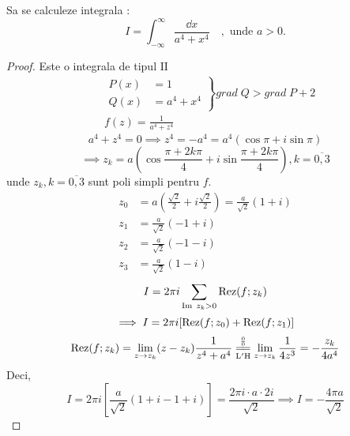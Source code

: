 
\begin{aplicatie}
    Sa se calculeze integrala :
    \[
        I = \int_{-\infty}^{\infty} \frac{\dd x}{a^4+x^4} \quad , \text{ unde } a > 0.
    \]
    \begin{proof}

    Este o integrala de tipul $\mathrm{II}$
    \begin{align*}
        &\left .
            \begin{aligned}
                P(x) &= 1 \\
                Q(x) &= a^4 +x^4
            \end{aligned}
        \right \}
        grad\; Q > grad\; P+2 \\
        & f(z) = \frac{1}{a^4 +z^4}
    \end{align*}
    \[
        a^4 +z^4 = 0 \implies z^4 = -a^4 = a^4 (\cos \pi + i\sin \pi)
    \]
    \[
        \implies z_k = a \left( \cos \frac{\pi+2k\pi}{4} + i \sin \frac{\pi+2k\pi}{4} \right)
            , k=\overline{0,3}
    \]
    unde $z_k, k=\overline{0,3}$ sunt poli simpli pentru $f$.
    \begin{align*}
        z_0 &= a \left(\frac{\sqrt 2}{2} + i\frac{\sqrt 2}{2} \right)
            = \frac{a}{\sqrt 2} (1+i) \\
        z_1 &= \frac{a}{\sqrt 2} (-1+i) \\
        z_2 &= \frac{a}{\sqrt 2} (-1-i) \\
        z_3 &= \frac{a}{\sqrt 2} (1-i)
    \end{align*}
    \[
        I = 2 \pi i \sum_{\operatorname{Im}  \; z_k >0} \operatorname{Rez}(f;z_k)
    \]
    \[
        \implies I = 2 \pi i [\operatorname{Rez}(f;z_0) + \operatorname{Rez}(f;z_1)]
    \]
    \[
        \Rez(f;z_k) = \lim_{z \to z_k} (z-z_k) \frac{1}{z^4+a^4}
            \EqConformCaz
            \lim_{z \to z_k} \frac{1}{4z^3}
            = - \frac{z_k}{4a^4}
    \]
    Deci,
    \[
        I = 2 \pi i \left[ \frac{a}{\sqrt 2} (1+i -1 +i) \right]
            = \frac{2 \pi i \cdot a \cdot 2i}{\sqrt 2}
            \implies I = - \frac{4 \pi a}{\sqrt 2}
    \]
    \end{proof}
\end{aplicatie}

